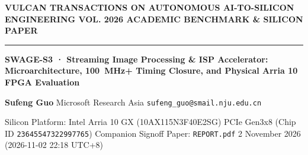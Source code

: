 \documentclass[11pt,a4paper]{article}
\begin{document}
{\scriptsize\sffamily\textcolor{vulcan}{\textbf{VULCAN TRANSACTIONS ON AUTONOMOUS AI-TO-SILICON ENGINEERING \hfill VOL. 2026 \textperiodcentered{} ACADEMIC BENCHMARK \& SILICON PAPER}}\par}

\vspace{1pt}\textcolor{vulcan}{\rule{\textwidth}{1.2pt}}\vspace{3pt}

\begin{center}

{\sffamily\LARGE\bfseries SWAGE-S3 · Streaming Image Processing \& ISP Accelerator: Microarchitecture, 100~MHz+ Timing Closure, and Physical Arria 10 FPGA Evaluation\par}\vspace{3pt}

{\small\sffamily\textbf{Sufeng Guo} \textperiodcentered{} Microsoft Research Asia \textperiodcentered{} \texttt{sufeng\_guo@smail.nju.edu.cn}\par}\vspace{1pt}

{\scriptsize\sffamily\textcolor{black!75}{Silicon Platform: Intel Arria 10 GX (\allowbreak{}10AX115N3F40E2SG)\allowbreak{} PCIe Gen3x8 (Chip ID \texttt{23645547322997765}) \textperiodcentered{} Companion Signoff Paper: \texttt{REPORT.pdf} \textperiodcentered{} 2 November 2026 (\allowbreak{}2026-11-02 22:18 UTC+\allowbreak{}8)\allowbreak{}}\par}

\end{center}\vspace{2pt}
\end{document}
